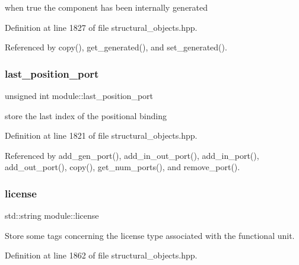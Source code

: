 when true the component has been internally generated 



Definition at line 1827 of file structural\+\_\+objects.\+hpp.



Referenced by copy(), get\+\_\+generated(), and set\+\_\+generated().

\mbox{\label{classmodule_a4e0286f0c329b668f81431d202609c08}} 
\subsubsection{\texorpdfstring{last\+\_\+position\+\_\+port}{last\_position\_port}}
{\footnotesize\ttfamily unsigned int module\+::last\+\_\+position\+\_\+port\hspace{0.3cm}{\ttfamily [private]}}



store the last index of the positional binding 



Definition at line 1821 of file structural\+\_\+objects.\+hpp.



Referenced by add\+\_\+gen\+\_\+port(), add\+\_\+in\+\_\+out\+\_\+port(), add\+\_\+in\+\_\+port(), add\+\_\+out\+\_\+port(), copy(), get\+\_\+num\+\_\+ports(), and remove\+\_\+port().

\mbox{\label{classmodule_afc3e93ad59925ead9e025e0bc747e50f}} 
\subsubsection{\texorpdfstring{license}{license}}
{\footnotesize\ttfamily std\+::string module\+::license\hspace{0.3cm}{\ttfamily [private]}}



Store some tags concerning the license type associated with the functional unit. 



Definition at line 1862 of file structural\+\_\+objects.\+hpp.



